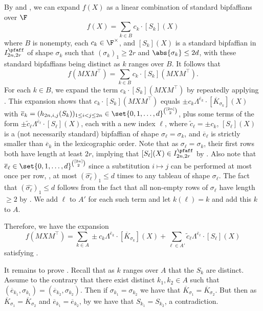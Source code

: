 \documentclass[letterpaper, 11pt]{amsart}
\begin{document}
\begin{pf}
By  and , we can expand $f(X)$ as a linear combination of standard bipfaffians over $\F$
\[
    f(X) = \sum_{k\in B} c_k \cdot [S_k](X)
\]
where $B$ is nonempty, each $c_k \in \F^\times$, and $[S_k](X)$ is a standard bipfaffian in $I^{\pfaff}_{2n, 2r}$ of shape $\sigma_k$ such that $(\sigma_k)_1 \geq 2r$ and $\abs{\sigma_k} \leq 2d$, with these standard bipfaffians being distinct as $k$ ranges over $B$.
It follows that 
\[
    f(MXM^\top) = \sum_{k\in B} c_k \cdot [S_k](MXM^\top).
\]
For each $k \in B$, we expand the term $c_k \cdot [S_k](MXM^\top)$ by repeatedly applying .
This expansion shows that $c_k \cdot [S_k](MXM^\top)$ equals $\pm c_k \Lambda^{\overline{e}_k}\cdot [\overline{K}_{\sigma_k}](X)$ with $\overline{e}_k=(h_{2n, i, j}(S_k))_{1\leq i < j \leq 2n} \in \set{0,1,\dots,d}^{\binom{[2n]}{2}}$, plus some terms of the form $\pm \widetilde{c}_{\ell}\Lambda^{\overline{e}_\ell}\cdot [S_\ell](X)$, each with a new index $\ell$, where $\widetilde{c}_{\ell}=\pm c_k$, $[S_\ell](X)$ is a (not necessarily standard) bipfaffian of shape $\sigma_\ell = \sigma_k$, and $\overline{e}_\ell$ is strictly smaller than $\overline{e}_k$ in the lexicographic order.
Note that as $\sigma_\ell=\sigma_k$, their first rows both have length at least $2r$, implying that $[S_\ell](X) \in I^{\pfaff}_{2n, 2r}$ by .
Also note that $\overline{e}_\ell \in \set{0, 1, \dots, d}^{\binom{[2n]}{2}}$ since a substitution $i \mapsto j$ can be performed at most once per row, \ie, at most $(\widehat{\sigma_\ell})_1 \leq d$ times to any tableau of shape $\sigma_\ell$.
The fact that $(\widehat{\sigma_\ell})_1 \leq d$ follows from the fact that all non-empty rows of $\sigma_\ell$ have length $\geq 2$ by .
We add $\ell$ to $A'$ for each such term and let $k(\ell) = k$ and add this $k$ to $A$.

Therefore, we have the expansion
\[
    f(MXM^\top) = \sum_{k \in A} \pm{c}_{k} \Lambda^{\overline{e}_k}\cdot [\overline{K}_{\sigma_k}](X) + \sum_{\ell\in A'} \widetilde{c}_{\ell} \Lambda^{\overline{e}_\ell}\cdot [S_\ell](X)
\]
satisfying .

It remains to prove .
Recall that as $k$ ranges over $A$ that the $S_k$ are distinct.
Assume to the contrary that there exist distinct $k_1, k_2\in A$ such that $(\overline{e}_{k_1},\sigma_{k_1})=(\overline{e}_{k_2},\sigma_{k_2})$.
Then if $\sigma_{k_1} = \sigma_{k_2}$ we have that $\overline{K}_{\sigma_1} = \overline{K}_{\sigma_2}$.
But then as $\overline{K}_{\sigma_1} = \overline{K}_{\sigma_2}$ and $\overline{e}_{k_1} = \overline{e}_{k_2}$, by  we have that $S_{k_1} = S_{k_2}$, a contradiction.
\end{pf}
\end{document}
